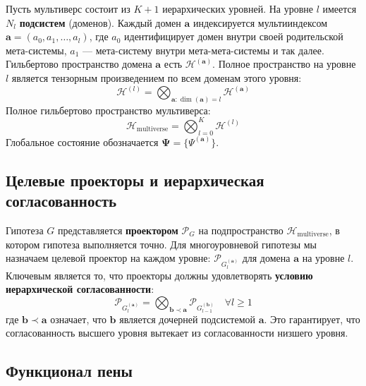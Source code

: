 \documentclass[11pt,a4paper]{article}
\begin{document}
Пусть мультиверс состоит из \(K+1\) иерархических уровней. На уровне \(l\) имеется \(N_l\) \textbf{подсистем} (доменов). Каждый домен \(\mathbf{a}\) индексируется мультииндексом \(\mathbf{a} = (a_0, a_1, \dots, a_l)\), где \(a_0\) идентифицирует домен внутри своей родительской мета-системы, \(a_1\) — мета-систему внутри мета-мета-системы и так далее. Гильбертово пространство домена \(\mathbf{a}\) есть \(\mathcal{H}^{(\mathbf{a})}\). Полное пространство на уровне \(l\) является тензорным произведением по всем доменам этого уровня:
\begin{equation}
\mathcal{H}^{(l)} = \bigotimes_{\mathbf{a}: \dim(\mathbf{a}) = l} \mathcal{H}^{(\mathbf{a})}
\end{equation}
Полное гильбертово пространство мультиверса:
\begin{equation}
\mathcal{H}_{\text{multiverse}} = \bigotimes_{l=0}^{K} \mathcal{H}^{(l)}
\end{equation}
Глобальное состояние обозначается \(\mathbf{\Psi} = \{\Psi^{(\mathbf{a})}\}\).

\subsection{Целевые проекторы и иерархическая согласованность}

Гипотеза \(G\) представляется \textbf{проектором} \(\mathcal{P}_G\) на подпространство \(\mathcal{H}_{\text{multiverse}}\), в котором гипотеза выполняется точно. Для многоуровневой гипотезы мы назначаем целевой проектор на каждом уровне: \(\mathcal{P}_{G_l^{(\mathbf{a})}}\) для домена \(\mathbf{a}\) на уровне \(l\). Ключевым является то, что проекторы должны удовлетворять \textbf{условию иерархической согласованности}:
\begin{equation}
\mathcal{P}_{G_l^{(\mathbf{a})}} = \bigotimes_{\mathbf{b} \prec \mathbf{a}} \mathcal{P}_{G_{l-1}^{(\mathbf{b})}} \quad \forall l \ge 1
\end{equation}
где \(\mathbf{b} \prec \mathbf{a}\) означает, что \(\mathbf{b}\) является дочерней подсистемой \(\mathbf{a}\). Это гарантирует, что согласованность высшего уровня вытекает из согласованности низшего уровня.

\subsection{Функционал пены}
\end{document}
